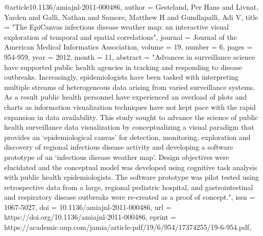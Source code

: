 @article{10.1136/amiajnl-2011-000486,
    author = {Gesteland, Per Hans and Livnat, Yarden and Galli, Nathan and Samore, Matthew H and Gundlapalli, Adi V},
    title = "{The EpiCanvas infectious disease weather map: an interactive visual exploration of temporal and spatial correlations}",
    journal = {Journal of the American Medical Informatics Association},
    volume = {19},
    number = {6},
    pages = {954-959},
    year = {2012},
    month = {11},
    abstract = "{Advances in surveillance science have supported public health agencies in tracking and responding to disease outbreaks. Increasingly, epidemiologists have been tasked with interpreting multiple streams of heterogeneous data arising from varied surveillance systems. As a result public health personnel have experienced an overload of plots and charts as information visualization techniques have not kept pace with the rapid expansion in data availability. This study sought to advance the science of public health surveillance data visualization by conceptualizing a visual paradigm that provides an ‘epidemiological canvas’ for detection, monitoring, exploration and discovery of regional infectious disease activity and developing a software prototype of an ‘infectious disease weather map'. Design objectives were elucidated and the conceptual model was developed using cognitive task analysis with public health epidemiologists. The software prototype was pilot tested using retrospective data from a large, regional pediatric hospital, and gastrointestinal and respiratory disease outbreaks were re-created as a proof of concept.}",
    issn = {1067-5027},
    doi = {10.1136/amiajnl-2011-000486},
    url = {https://doi.org/10.1136/amiajnl-2011-000486},
    eprint = {https://academic.oup.com/jamia/article-pdf/19/6/954/17374255/19-6-954.pdf},
}



